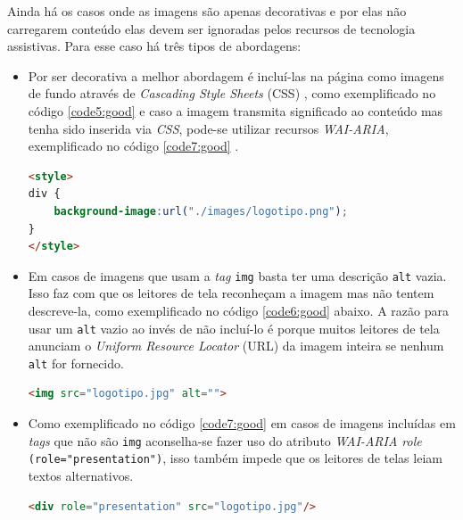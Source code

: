 Ainda há os casos onde as imagens são apenas decorativas e por elas não carregarem conteúdo elas devem ser ignoradas pelos recursos de tecnologia assistivas. Para esse caso há três tipos de abordagens: 
\begin{itemize}
\item Por ser decorativa a melhor abordagem é incluí-las na página como imagens de fundo através de \textit{Cascading Style Sheets} (CSS) \cite{CSS}, como exemplificado no código \ref{code5:good} e caso a imagem transmita significado ao conteúdo mas tenha sido inserida via \textit{CSS}, pode-se utilizar recursos \textit{WAI-ARIA}, exemplificado no código \ref{code7:good} .
{\begin{lstlisting}[language=html,caption={Adição de imagens via CSS.}, label=code5:good]
<style>
div {
    background-image:url("./images/logotipo.png");
}
</style>
\end{lstlisting}}
\item Em casos de imagens que usam a \textit{tag} \lstinline{img} basta ter uma descrição \lstinline{alt} vazia. Isso faz com que os leitores de tela reconheçam a imagem mas não tentem descreve-la, como exemplificado no código \ref{code6:good} abaixo. A razão para usar um \lstinline{alt} vazio ao invés de não incluí-lo é porque muitos leitores de tela anunciam o \textit{Uniform Resource Locator} (URL) da imagem inteira se nenhum \lstinline{alt} for fornecido.
{\begin{lstlisting}[language=html,caption={Uso do atributo \lstinline{alt} vazio.}, label=code6:good]
<img src="logotipo.jpg" alt=""> 
\end{lstlisting}}

\item Como exemplificado no código \ref{code7:good} em casos de imagens incluídas em \textit{tags} que não são \lstinline{img} aconselha-se fazer uso do atributo \textit{WAI-ARIA role} \lstinline{(role="presentation")}, isso também impede que os leitores de telas leiam textos alternativos. 
{\begin{lstlisting}[language=html,caption={Uso atributo WAI-ARIA \cite{WAI-ARIA} role presentation.}, label=code7:good]
<div role="presentation" src="logotipo.jpg"/>
\end{lstlisting}}

\end{itemize}

